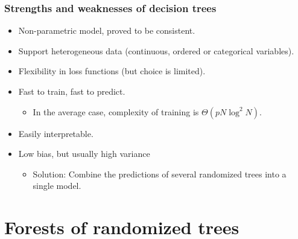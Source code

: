\documentclass{beamer}
\begin{document}
\begin{frame}
  \frametitle{Strengths and weaknesses of decision trees}

  \begin{itemize}
    \item {\color{blue} Non-parametric} model, proved to be
          {\color{blue} consistent}.

    \vspace{0.25cm}

    \item Support {\color{blue} heterogeneous} data (continuous, ordered or
          categorical variables).

    \vspace{0.25cm}

    \item {\color{blue}Flexibility} in loss functions (but choice is
          {\color{red}limited}).

    \vspace{0.25cm}

    \item {\color{blue} Fast} to train, {\color{blue} fast} to predict.
        \begin{itemize}
            \item In the average case, complexity of training is $\Theta(pN\log^2 N)$.
        \end{itemize}

    \vspace{0.25cm}

    \item Easily {\color{blue} interpretable}.

    \vspace{0.25cm}

    \item {\color{blue} Low bias}, but usually {\color{red} high variance}\\
        \begin{itemize}
            \item Solution: Combine the predictions of several randomized
                  trees into a single model.
        \end{itemize}
  \end{itemize}
\end{frame}



\section{Forests of randomized trees}
\end{document}
